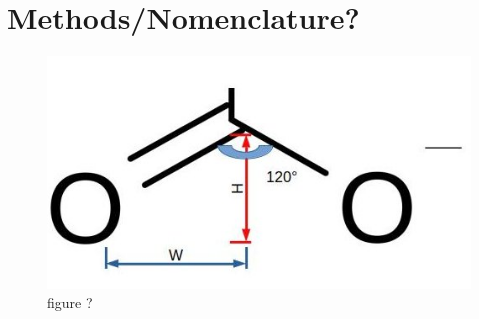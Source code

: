 \documentclass[journal=jacsat,manuscript=article]{achemso}
\begin{document}
\section{Methods/Nomenclature?}

\begin{figure}[H]
\includegraphics[scale=0.4]{fig13.jpeg}
\caption{figure ?}
\label{figure ?}
\end{figure}
\end{document}
